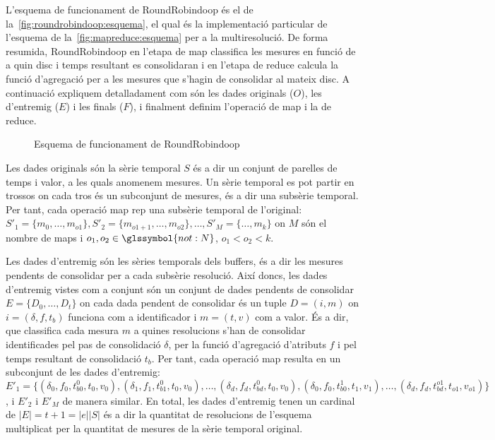 L'esquema de funcionament de RoundRobindoop és el de
la~\autoref{fig:roundrobindoop:esquema}, el qual és la implementació
particular de l'esquema de la~\autoref{fig:mapreduce:esquema} per a la
multiresolució.  De forma resumida, RoundRobindoop en l'etapa de map
classifica les mesures en funció de a quin disc i temps resultant es
consolidaran i en l'etapa de reduce calcula la funció d'agregació per
a les mesures que s'hagin de consolidar al mateix disc.  A continuació
expliquem detalladament com són les dades originals ($O$), les
d'entremig ($E$) i les finals ($F$), i finalment definim l'operació de
map i la de reduce.





\begin{figure}[tp]
  \centering
  
  \caption{Esquema de funcionament de RoundRobindoop}
  \label{fig:roundrobindoop:esquema}
\end{figure}






Les dades originals són la sèrie temporal $S$ és a dir un conjunt de
parelles de temps i valor, a les quals anomenem mesures. Un sèrie
temporal es pot partir en trossos on cada tros és un subconjunt de
mesures, és a dir una subsèrie temporal. Per tant, cada operació map
rep una subsèrie temporal de l'original: $S'_1 =
\{m_0,\dotsc,m_{o1}\}, S'_2 = \{m_{o1+1},\dotsc,m_{o2}\}, \dotsc, S'_M
= \{\dotsc,m_{k}\}$ on $M$ són el nombre de maps i $o_1,o_2\in
\glssymbol{not:N}$, $o_1 < o_2 < k$.



Les dades d'entremig són les sèries temporals dels buffers, és a dir
les mesures pendents de consolidar per a cada subsèrie resolució.
Així doncs, les dades d'entremig vistes com a conjunt són un conjunt
de dades pendents de consolidar $E=\{ D_{0}, \dotsc, D_t\}$ on cada
dada pendent de consolidar és un tuple $D=(i,m)$ on $i=(\delta,f,t_b)$
funciona com a identificador i $m=(t,v)$ com a valor.  És a dir, que
classifica cada mesura $m$ a quines resolucions s'han de consolidar
identificades pel pas de consolidació $\delta$, per la funció
d'agregació d'atributs $f$ i pel temps resultant de consolidació
$t_b$. Per tant, cada operació map resulta en un subconjunt de les
dades d'entremig: $E'_1=\{ (\delta_0,f_0, t_{b0}^0, t_0,v_0),
(\delta_1,f_1, t_{b1}^0, t_0,v_0), \dotsc , (\delta_d,f_d, t_{bd}^0,
t_0,v_0), (\delta_0,f_0, t_{b0}^1, t_1,v_1), \dotsc, (\delta_d,f_d,
t_{bd}^{o1}, t_{o1},v_{o1}) \}$, i $E'_2$ i $E'_M$ de manera similar.
En total, les dades d'entremig tenen un cardinal de $|E|=t+1=|e||S|$
és a dir la quantitat de resolucions de l'esquema multiplicat per la
quantitat de mesures de la sèrie temporal original.


